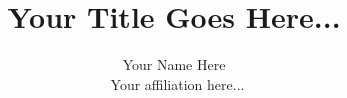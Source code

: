 \documentclass[10pt,twocolumn,letterpaper]{article}
\title{%
    Your Title Goes Here...}
\author{%
    Your Name Here\hspace{0.4em}\authornote{1} \\
    \authornote{1}\,%
        Your affiliation here... \\
}
\date{}
\begin{document}
\maketitle







{
    \small
    
    
}
\newpage
\appendix

\end{document}

